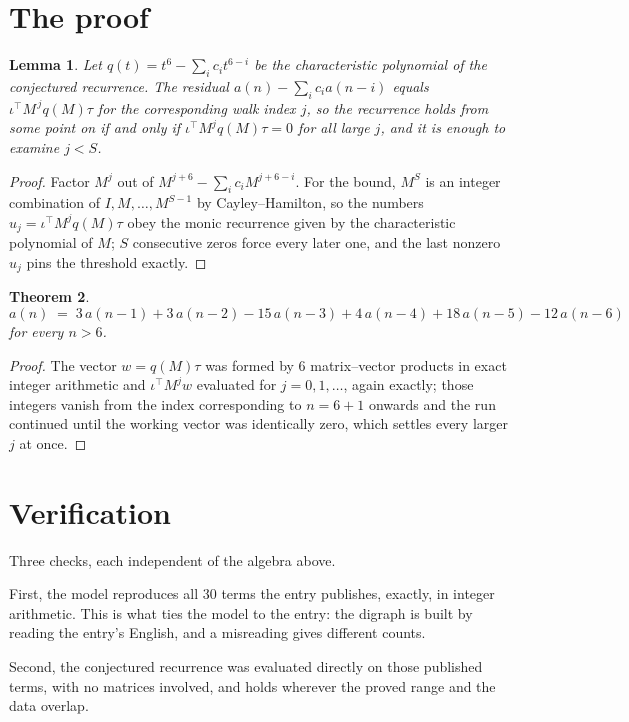 \documentclass[11pt,a4paper]{article}
\theoremstyle{plain}
\newtheorem{theorem}{Theorem}
\newtheorem{lemma}[theorem]{Lemma}
\theoremstyle{definition}
\begin{document}
\section{The proof}

\begin{lemma}\label{lem:crit}
Let $q(t)=t^{6}-\sum_i c_it^{6-i}$ be the characteristic polynomial of the
conjectured recurrence. The residual $a(n)-\sum_ic_ia(n-i)$ equals
$\iota^{\!\top}M^{\,j}q(M)\tau$ for the corresponding walk index $j$, so the recurrence
holds from some point on if and only if $\iota^{\!\top}M^{j}q(M)\tau=0$ for all large $j$,
and it is enough to examine $j<S$.
\end{lemma}

\begin{proof}
Factor $M^{j}$ out of $M^{j+6}-\sum_ic_iM^{j+6-i}$. For the bound, $M^{S}$
is an integer combination of $I,M,\dots,M^{S-1}$ by Cayley--Hamilton, so the numbers
$u_j=\iota^{\!\top}M^{j}q(M)\tau$ obey the monic recurrence given by the characteristic
polynomial of $M$; $S$ consecutive zeros force every later one, and the last nonzero $u_j$
pins the threshold exactly.
\end{proof}

\begin{theorem}
\[
a(n)\;=\;3\,a(n-1) + 3\,a(n-2) - 15\,a(n-3) + 4\,a(n-4) + 18\,a(n-5) - 12\,a(n-6)
\]
for every $n>6$.
\end{theorem}

\begin{proof}
The vector $w=q(M)\tau$ was formed by $6$ matrix--vector products in exact integer
arithmetic and $\iota^{\!\top}M^{j}w$ evaluated for $j=0,1,\dots$, again exactly; those
integers vanish from the index corresponding to $n=6+1$ onwards and the run continued
until the working vector was identically zero, which settles every larger $j$ at once.
\end{proof}

\section{Verification}

Three checks, each independent of the algebra above.

First, the model reproduces all $30$ terms the entry publishes, exactly, in integer
arithmetic. This is what ties the model to the entry: the digraph is built by reading the
entry's English, and a misreading gives different counts.

Second, the conjectured recurrence was evaluated directly on those published terms, with no
matrices involved, and holds wherever the proved range and the data overlap.
\end{document}
